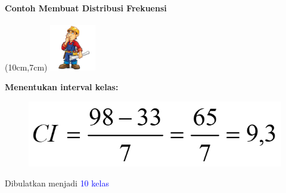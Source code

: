 \documentclass[main.tex]{subfiles}
\begin{document}
\begin{frame}[c]
	\frametitle{}
	\framesubtitle{Contoh Membuat Distribusi Frekuensi}


	\begin{textblock*}{2cm}(10cm,7cm) %
		\includegraphics[width=2cm]{figures/cons}
	\end{textblock*}

\end{frame}

\begin{frame}[c]
	\textbf{Menentukan interval kelas:}
	\begin{figure}
		\begin{center}
			\includegraphics[scale=0.5]{figures/disfrek4}
		\end{center}
	\end{figure}
	Dibulatkan menjadi \textcolor{blue}{10 kelas}

\end{frame}
\end{document}
